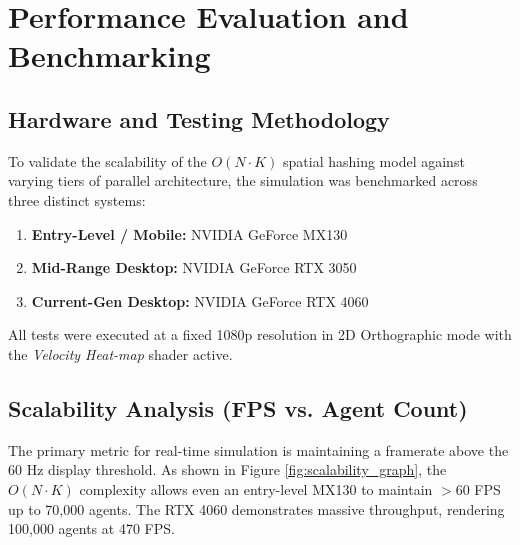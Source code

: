 \documentclass[12pt,a4paper]{report}
\begin{document}
\chapter{Performance Evaluation and Benchmarking}

\section{Hardware and Testing Methodology}
To validate the scalability of the $O(N \cdot K)$ spatial hashing model against varying tiers of parallel architecture, the simulation was benchmarked across three distinct systems:
\begin{enumerate}
    \item \textbf{Entry-Level / Mobile:} NVIDIA GeForce MX130
    \item \textbf{Mid-Range Desktop:} NVIDIA GeForce RTX 3050
    \item \textbf{Current-Gen Desktop:} NVIDIA GeForce RTX 4060
\end{enumerate}
All tests were executed at a fixed 1080p resolution in 2D Orthographic mode with the \textit{Velocity Heat-map} shader active.

\section{Scalability Analysis (FPS vs. Agent Count)}
The primary metric for real-time simulation is maintaining a framerate above the 60 Hz display threshold. As shown in Figure \ref{fig:scalability_graph}, the $O(N \cdot K)$ complexity allows even an entry-level MX130 to maintain $>60$ FPS up to 70,000 agents. The RTX 4060 demonstrates massive throughput, rendering 100,000 agents at 470 FPS.
\end{document}
